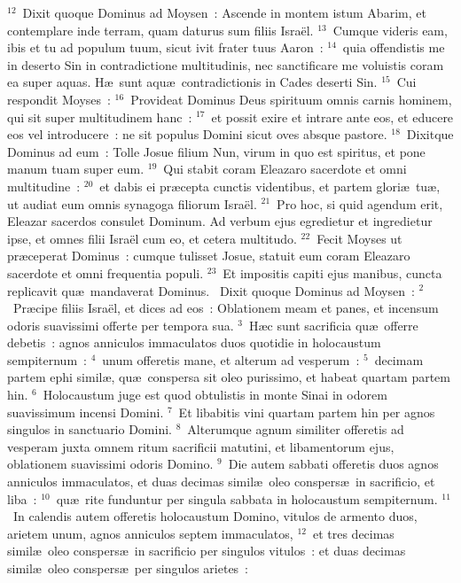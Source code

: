 ${}^{12}$~Dixit quoque Dominus ad Moysen~: Ascende in montem istum Abarim, et contemplare inde terram, quam daturus sum filiis Isra\"el.
${}^{13}$~Cumque videris eam, ibis et tu ad populum tuum, sicut ivit frater tuus Aaron~:
${}^{14}$~quia offendistis me in deserto Sin in contradictione multitudinis, nec sanctificare me voluistis coram ea super aquas. H\ae\ sunt aqu\ae\ contradictionis in Cades deserti Sin.
${}^{15}$~Cui respondit Moyses~:
${}^{16}$~Provideat Dominus Deus spirituum omnis carnis hominem, qui sit super multitudinem hanc~:
${}^{17}$~et possit exire et intrare ante eos, et educere eos vel introducere~: ne sit populus Domini sicut oves absque pastore.
${}^{18}$~Dixitque Dominus ad eum~: Tolle Josue filium Nun, virum in quo est spiritus, et pone manum tuam super eum.
${}^{19}$~Qui stabit coram Eleazaro sacerdote et omni multitudine~:
${}^{20}$~et dabis ei pr\ae cepta cunctis videntibus, et partem glori\ae\ tu\ae , ut audiat eum omnis synagoga filiorum Isra\"el.
${}^{21}$~Pro hoc, si quid agendum erit, Eleazar sacerdos consulet Dominum. Ad verbum ejus egredietur et ingredietur ipse, et omnes filii Isra\"el cum eo, et cetera multitudo.
${}^{22}$~Fecit Moyses ut pr\ae ceperat Dominus~: cumque tulisset Josue, statuit eum coram Eleazaro sacerdote et omni frequentia populi.
${}^{23}$~Et impositis capiti ejus manibus, cuncta replicavit qu\ae\ mandaverat Dominus.
~Dixit quoque Dominus ad Moysen~:
${}^{2}$~Pr\ae cipe filiis Isra\"el, et dices ad eos~: Oblationem meam et panes, et incensum odoris suavissimi offerte per tempora sua.
${}^{3}$~H\ae c sunt sacrificia qu\ae\ offerre debetis~: agnos anniculos immaculatos duos quotidie in holocaustum sempiternum~:
${}^{4}$~unum offeretis mane, et alterum ad vesperum~:
${}^{5}$~decimam partem ephi simil\ae , qu\ae\ conspersa sit oleo purissimo, et habeat quartam partem hin.
${}^{6}$~Holocaustum juge est quod obtulistis in monte Sinai in odorem suavissimum incensi Domini.
${}^{7}$~Et libabitis vini quartam partem hin per agnos singulos in sanctuario Domini.
${}^{8}$~Alterumque agnum similiter offeretis ad vesperam juxta omnem ritum sacrificii matutini, et libamentorum ejus, oblationem suavissimi odoris Domino.
${}^{9}$~Die autem sabbati offeretis duos agnos anniculos immaculatos, et duas decimas simil\ae\ oleo conspers\ae\ in sacrificio, et liba~:
${}^{10}$~qu\ae\ rite funduntur per singula sabbata in holocaustum sempiternum.
${}^{11}$~In calendis autem offeretis holocaustum Domino, vitulos de armento duos, arietem unum, agnos anniculos septem immaculatos,
${}^{12}$~et tres decimas simil\ae\ oleo conspers\ae\ in sacrificio per singulos vitulos~: et duas decimas simil\ae\ oleo conspers\ae\ per singulos arietes~:
